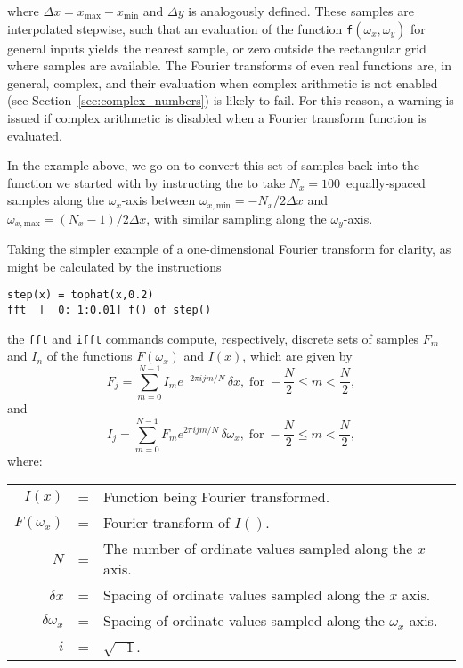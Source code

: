 \noindent where $\Delta x=x_\mathrm{max}-x_\mathrm{min}$ and $\Delta y$ is
analogously defined. These samples are interpolated stepwise, such that an
evaluation of the function {\tt f}$(\omega_x,\omega_y)$ for general inputs
yields the nearest sample, or zero outside the rectangular grid where samples
are available. The Fourier transforms of even real functions are, in general,
complex, and their evaluation when complex arithmetic is not enabled (see
Section~\ref{sec:complex_numbers}) is likely to fail. For this reason, a
warning is issued if complex arithmetic is disabled when a Fourier transform
function is evaluated.

In the example above, we go on to convert this set of samples back into the
function we started with by instructing the  to take
$N_x=100$~equally-spaced samples along the $\omega_x$-axis between
$\omega_{x,\mathrm{min}}=-{N_x}/{2\Delta x}$ and
$\omega_{x,\mathrm{max}}=(N_x-1)/{2\Delta x}$, with similar sampling along the
$\omega_y$-axis.

Taking the simpler example of a one-dimensional Fourier transform for clarity,
as might be calculated by the instructions
\begin{verbatim}
step(x) = tophat(x,0.2)
fft  [  0: 1:0.01] f() of step()
\end{verbatim}
the {\tt fft} and {\tt ifft} commands compute,
respectively, discrete sets of samples $F_m$ and $I_n$ of the functions
$F(\omega_x)$ and $I(x)$, which are given by
\begin{displaymath}
F_j = \sum_{m=0}^{N-1} I_m e^{-2\pi ijm/N} \,\delta x,\;\textrm{for}\; -\frac{N}{2}\leq m <\frac{N}{2} ,
\end{displaymath}
\noindent and
\begin{displaymath}
I_j = \sum_{m=0}^{N-1} F_m e^{ 2\pi ijm/N} \,\delta \omega_x,\;\textrm{for}\; -\frac{N}{2}\leq m <\frac{N}{2} ,
\end{displaymath}
\noindent where:
\begin{tabular}{rcp{9cm}}
$I(x)$        & = & Function being Fourier transformed. \\
$F(\omega_x)$ & = & Fourier transform of $I()$. \\
$N$           & = & The number of ordinate values sampled along the $x$ axis. \\
$\delta x$    & = & Spacing of ordinate values sampled along the $x$ axis. \\
$\delta \omega_x$ & = & Spacing of ordinate values sampled along the $\omega_x$ axis. \\
$i$           & = & $\sqrt{-1}$. \\
\end{tabular}
\vspace{2mm}

